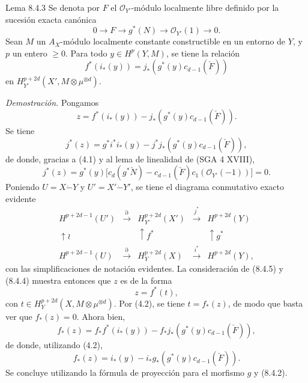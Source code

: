 \begin{statement}{Lema 8.4.3}
Se denota por $F$ el $\mathcal O_{Y'}$-módulo localmente libre definido por la sucesión exacta canónica
\[
0\to F\to g^*(N)\to\mathcal O_{Y'}(1)\to0.
\]
Sean $M$ un $A_X$-módulo localmente constante constructible en un entorno de $Y$, y $p$ un entero $\ge0$. Para todo $y\in H^p(Y,M)$, se tiene la relación
\[
f^*(i_*(y))=j_*(g^*(y)c_{d-1}(\check F))
\]
en $H_{Y'}^{p+2d}(X',M\otimes\mu^{\otimes d})$.
\end{statement}

\emph{Demostración.} Pongamos
\[
z=f^*(i_*(y))-j_*(g^*(y)c_{d-1}(\check F)).
\]
Se tiene
\[
j^*(z)=g^*i^*i_*(y)-j^*j_*(g^*(y)c_{d-1}(\check F)),
\]
de donde, gracias a (4.1) y al lema de linealidad de (SGA 4 XVIII),
\[
j^*(z)=g^*(y)\bigl[c_d(g^*\check N)-c_{d-1}(\check F)c_1(\mathcal O_{Y'}(-1))\bigr]=0.
\tag{8.4.4}
\]
Poniendo $U=X\mathbin{\dot{-}}Y$ y $U'=X'\mathbin{\dot{-}}Y'$, se tiene el diagrama conmutativo exacto evidente
\[
\begin{array}{ccccc}
H^{p+2d-1}(U')&\xrightarrow{\partial}&H^{p+2d}_{Y'}(X')&\xrightarrow{j^*}&H^{p+2d}(Y)\\
\uparrow\wr&&\uparrow f^*&&\uparrow g^*\\
H^{p+2d-1}(U)&\xrightarrow{\partial}&H_Y^{p+2d}(X)&\xrightarrow{i^*}&H^{p+2d}(Y),
\end{array}
\tag{8.4.5}
\]
con las simplificaciones de notación evidentes. La consideración de (8.4.5) y (8.4.4) muestra entonces que $z$ es de la forma
\[
z=f^*(t),
\]
con $t\in H_Y^{p+2d}(X,M\otimes\mu^{\otimes d})$. Por (4.2), se tiene $t=f_*(z)$, de modo que basta ver que $f_*(z)=0$. Ahora bien,
\[
f_*(z)=f_*f^*(i_*(y))-f_*j_*(g^*(y)c_{d-1}(\check F)),
\]
de donde, utilizando (4.2),
\[
f_*(z)=i_*(y)-i_*g_*(g^*(y)c_{d-1}(\check F)).
\]
Se concluye utilizando la fórmula de proyección para el morfismo $g$ y (8.4.2).
